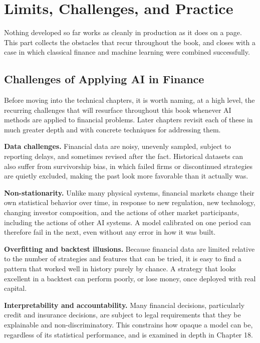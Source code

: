 \documentclass[../ai_in_finance]{subfiles}
\begin{document}
\section{Limits, Challenges, and Practice}

Nothing developed so far works as cleanly in production as it does on a page. This part collects the obstacles that recur throughout the book, and closes with a case in which classical finance and machine learning were combined successfully.

\subsection{Challenges of Applying AI in Finance}

Before moving into the technical chapters, it is worth naming, at a high level, the recurring challenges that will resurface throughout this book whenever AI methods are applied to financial problems. Later chapters revisit each of these in much greater depth and with concrete techniques for addressing them.

\textbf{Data challenges.} Financial data are noisy, unevenly sampled, subject to reporting delays, and sometimes revised after the fact. Historical datasets can also suffer from survivorship bias, in which failed firms or discontinued strategies are quietly excluded, making the past look more favorable than it actually was.

\textbf{Non-stationarity.} Unlike many physical systems, financial markets change their own statistical behavior over time, in response to new regulation, new technology, changing investor composition, and the actions of other market participants, including the actions of other AI systems. A model calibrated on one period can therefore fail in the next, even without any error in how it was built.

\textbf{Overfitting and backtest illusions.} Because financial data are limited relative to the number of strategies and features that can be tried, it is easy to find a pattern that worked well in history purely by chance. A strategy that looks excellent in a backtest can perform poorly, or lose money, once deployed with real capital.

\textbf{Interpretability and accountability.} Many financial decisions, particularly credit and insurance decisions, are subject to legal requirements that they be explainable and non-discriminatory. This constrains how opaque a model can be, regardless of its statistical performance, and is examined in depth in Chapter 18.
\end{document}
